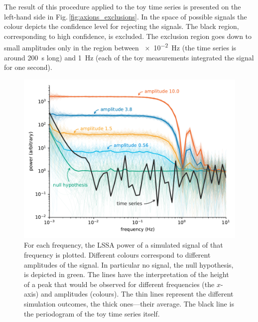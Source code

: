 The result of this procedure applied to the toy time series is presented on the left-hand side in Fig.\,\ref{fig:axions_exclusions}. In the space of possible signals the colour depicts the confidence level for rejecting the signals. The black region, corresponding to high confidence, is excluded. The exclusion region goes down to small amplitudes only in the region between \SI{e-2}{\hertz} (the time series is around \SI{200}{\second} long) and \SI{1}{\hertz} (each of the toy measurements integrated the signal for one second).

\begin{figure}
  \centering \includegraphics[width=\linewidth]{gfx/axions/basic_exclusion_sensitivity.pdf}
  \caption{For each frequency, the LSSA power of a simulated signal of that frequency is plotted. Different colours correspond to different amplitudes of the signal. In particular no signal, the null hypothesis, is depicted in green. The lines have the interpretation of the height of a peak that would be observed for different frequencies (the $x$-axis) and amplitudes (colours). The thin lines represent the different simulation outcomes, the thick ones---their average. The black line is the periodogram of the toy time series itself.}\label{fig:sensitivity}
\end{figure}

